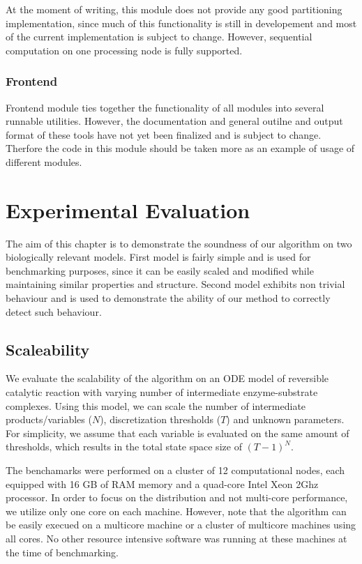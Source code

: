 \documentclass[12pt,oneside,draft]{fithesis2}
\begin{document}
				At the moment of writing, this module does not provide any good partitioning implementation, since much of this functionality is still in developement and most of the current implementation is subject to change. However, sequential computation on one processing node is fully supported.
				
			\subsection{Frontend}			
			
				Frontend module ties together the functionality of all modules into several runnable utilities. However, the documentation and general outilne and output format of these tools have not yet been finalized and is subject to change. Therfore the code in this module should be taken more as an example of usage of different modules.	
				
		\chapter{Experimental Evaluation}

			The aim of this chapter is to demonstrate the soundness of our algorithm on two biologically relevant models. First model is fairly simple and is used for benchmarking purposes, since it can be easily scaled and modified while maintaining similar properties and structure. Second model exhibits non trivial behaviour and is used to demonstrate the ability of our method to correctly detect such behaviour. 
		
			\section{Scaleability}	
			
				We evaluate the scalability of the algorithm on an ODE model of reversible catalytic reaction with varying number of intermediate enzyme-substrate complexes.  Using this model, we can scale the number of intermediate products/variables ($N$), discretization thresholds ($T$) and unknown parameters. For simplicity, we assume that each variable is evaluated on the same amount of thresholds, which results in the total state space size of $(T - 1)^N$. 
				
				
				The benchamarks were performed on a cluster of 12 computational nodes, each equipped with 16 GB of RAM memory and a quad-core Intel Xeon 2Ghz processor. In order to focus on the distribution and not multi-core performance, we utilize only one core on each machine. However, note that the algorithm can be easily execued on a multicore machine or a cluster of multicore machines using all cores. No other resource intensive software was running at these machines at the time of benchmarking.
				
\end{document}
